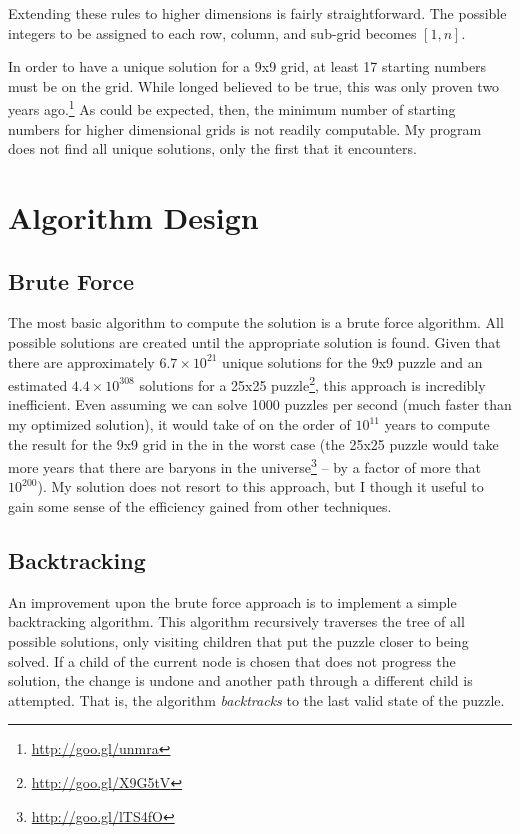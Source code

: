 \documentclass{article}
\begin{document}
Extending these rules to higher dimensions is fairly straightforward. The possible integers to be assigned to each row, column, and sub-grid becomes $[1,n]$.

In order to have a unique solution for a 9x9 grid, at least 17 starting numbers must be on the grid. While longed believed to be true, this was only proven two years ago.\footnote{\url{http://goo.gl/unmra}} As could be expected, then, the minimum number of starting numbers for higher dimensional grids is not readily computable. My program does not find all unique solutions, only the first that it encounters.

\section*{Algorithm Design}

\subsection*{Brute Force}

The most basic algorithm to compute the solution is a brute force algorithm. All possible solutions are created until the appropriate solution is found. Given that there are approximately $6.7 \times 10^{21}$ unique solutions for the 9x9 puzzle and 
an estimated $4.4\times10^{308}$ solutions for a 25x25 puzzle\footnote{\url{http://goo.gl/X9G5tV}}, this approach is incredibly inefficient. Even assuming we can solve 1000 puzzles per second (much faster than my optimized solution), it would take of on the order of $10^{11}$ years to compute the result for the 9x9 grid in the in the worst case (the 25x25 puzzle would take more years that there are baryons in the universe\footnote{\url{http://goo.gl/lTS4fO}} -- by a factor of more that $10^{200}$). My solution does not resort to this approach, but I though it useful to gain some sense of the efficiency gained from other techniques.


\subsection*{Backtracking}

An improvement upon the brute force approach is to implement a simple backtracking algorithm. This algorithm recursively traverses the tree of all possible solutions, only visiting children that put the puzzle closer to being solved. If a child of the current node is chosen that does not progress the solution, the change is undone and another path through a different child is attempted. That is, the algorithm \textit{backtracks} to the last valid state of the puzzle.
\end{document}
